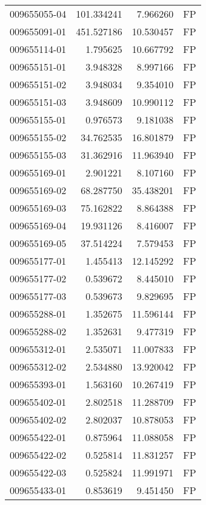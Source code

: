 \begin{tabular}{lrrl}
009655055-04 &  101.334241 &       7.966260 &   FP \\
009655091-01 &  451.527186 &      10.530457 &   FP \\
009655114-01 &    1.795625 &      10.667792 &   FP \\
009655151-01 &    3.948328 &       8.997166 &   FP \\
009655151-02 &    3.948034 &       9.354010 &   FP \\
009655151-03 &    3.948609 &      10.990112 &   FP \\
009655155-01 &    0.976573 &       9.181038 &   FP \\
009655155-02 &   34.762535 &      16.801879 &   FP \\
009655155-03 &   31.362916 &      11.963940 &   FP \\
009655169-01 &    2.901221 &       8.107160 &   FP \\
009655169-02 &   68.287750 &      35.438201 &   FP \\
009655169-03 &   75.162822 &       8.864388 &   FP \\
009655169-04 &   19.931126 &       8.416007 &   FP \\
009655169-05 &   37.514224 &       7.579453 &   FP \\
009655177-01 &    1.455413 &      12.145292 &   FP \\
009655177-02 &    0.539672 &       8.445010 &   FP \\
009655177-03 &    0.539673 &       9.829695 &   FP \\
009655288-01 &    1.352675 &      11.596144 &   FP \\
009655288-02 &    1.352631 &       9.477319 &   FP \\
009655312-01 &    2.535071 &      11.007833 &   FP \\
009655312-02 &    2.534880 &      13.920042 &   FP \\
009655393-01 &    1.563160 &      10.267419 &   FP \\
009655402-01 &    2.802518 &      11.288709 &   FP \\
009655402-02 &    2.802037 &      10.878053 &   FP \\
009655422-01 &    0.875964 &      11.088058 &   FP \\
009655422-02 &    0.525814 &      11.831257 &   FP \\
009655422-03 &    0.525824 &      11.991971 &   FP \\
009655433-01 &    0.853619 &       9.451450 &   FP \\

\end{tabular}
